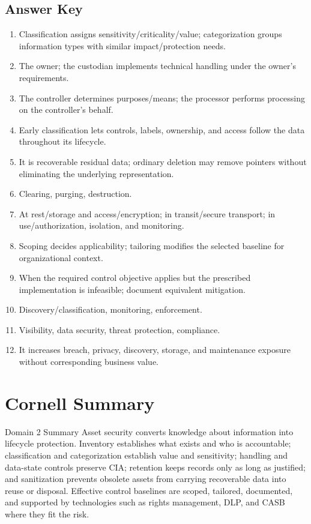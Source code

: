 \documentclass[10pt,letterpaper]{article}
\begin{document}
\subsection*{\color{teal}Answer Key}
\begin{enumerate}
\item Classification assigns sensitivity/criticality/value; categorization groups information types with similar impact/protection needs.
\item The owner; the custodian implements technical handling under the owner's requirements.
\item The controller determines purposes/means; the processor performs processing on the controller's behalf.
\item Early classification lets controls, labels, ownership, and access follow the data throughout its lifecycle.
\item It is recoverable residual data; ordinary deletion may remove pointers without eliminating the underlying representation.
\item Clearing, purging, destruction.
\item At rest/storage and access/encryption; in transit/secure transport; in use/authorization, isolation, and monitoring.
\item Scoping decides applicability; tailoring modifies the selected baseline for organizational context.
\item When the required control objective applies but the prescribed implementation is infeasible; document equivalent mitigation.
\item Discovery/classification, monitoring, enforcement.
\item Visibility, data security, threat protection, compliance.
\item It increases breach, privacy, discovery, storage, and maintenance exposure without corresponding business value.
\end{enumerate}

\section{\color{navy}Cornell Summary}
\begin{summarybox}{Domain 2 Summary}
Asset security converts knowledge about information into lifecycle protection. Inventory establishes what exists and who is accountable; classification and categorization establish value and sensitivity; handling and data-state controls preserve CIA; retention keeps records only as long as justified; and sanitization prevents obsolete assets from carrying recoverable data into reuse or disposal. Effective control baselines are scoped, tailored, documented, and supported by technologies such as rights management, DLP, and CASB where they fit the risk.
\end{summarybox}
\end{document}
